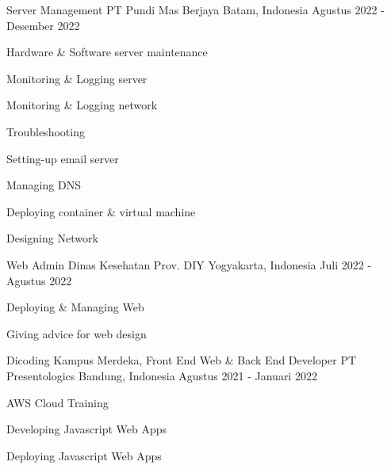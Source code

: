 

\begin{cventries}

  \cventry
    {Server Management} %
    {PT Pundi Mas Berjaya} %
    {Batam, Indonesia} %
    {Agustus 2022 - Desember 2022} %
    {
      \begin{cvitems} %
        \item {Hardware \& Software server maintenance}
        \item {Monitoring \& Logging server}
        \item {Monitoring \& Logging network}
        \item {Troubleshooting}
        \item {Setting-up email server}
        \item {Managing DNS}
        \item {Deploying container \& virtual machine}
        \item {Designing Network}
      \end{cvitems}
    }

  \cventry
    {Web Admin}
    {Dinas Kesehatan Prov. DIY}
    {Yogyakarta, Indonesia}
    {Juli 2022 - Agustus 2022}
    {
      \begin{cvitems}
      \item {Deploying \& Managing Web}
      \item {Giving advice for web design}
      \end{cvitems}
    }

  \cventry
    {Dicoding Kampus Merdeka, Front End Web \& Back End Developer}
    {PT Presentologics}
    {Bandung, Indonesia}
    {Agustus 2021 - Januari 2022}
    {
      \begin{cvitems}
      \item {AWS Cloud Training}
      \item {Developing Javascript Web Apps}
      \item {Deploying Javascript Web Apps}
      \end{cvitems}
    }

\end{cventries}
